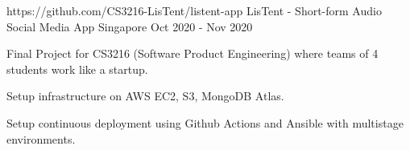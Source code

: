 \begin{cventries}
  \cventry
    {https://github.com/CS3216-LisTent/listent-app} %
    {LisTent - Short-form Audio Social Media App} %
    {Singapore} %
    {Oct 2020 - Nov 2020} %
    {
      \begin{cvitems} %
        \item {Final Project for CS3216 (Software Product Engineering) where teams of 4 students work like a startup.}
        \item {Setup infrastructure on AWS EC2, S3, MongoDB Atlas.}
        \item {Setup continuous deployment using Github Actions and Ansible with multistage environments.}
      \end{cvitems}
    }


\end{cventries}
